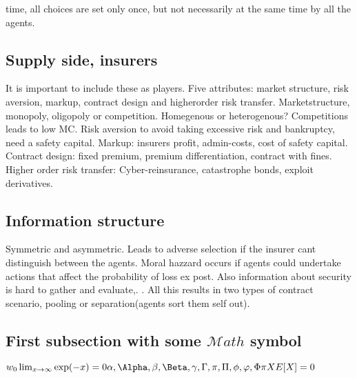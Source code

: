 time, all choices are set only once, but not necessarily at the same time by all the agents. 
\subsection{Supply side, insurers}
It is important to include these as players. Five attributes: market structure, risk aversion, markup, contract design and higherorder risk transfer.
Marketstructure, monopoly, oligopoly or competition. Homegenous or heterogenous? Competitions leads to low MC. Risk aversion to avoid taking excessive risk and bankruptcy, need a safety capital. 
Markup: insurers profit, admin-costs, cost of safety capital. 
Contract design: fixed premium, premium differentiation, contract with fines.
Higher order risk transfer: 
Cyber-reinsurance, catastrophe bonds, exploit derivatives.
\subsection{Information structure}
Symmetric and asymmetric. Leads to adverse selection if the insurer cant distinguish between the agents. Moral hazzard occurs if agents could undertake actions that affect the probability of loss ex post. Also information about security is hard to gather and evaluate,. . All this results in two types of contract scenario, pooling or separation(agents sort them self out).


 
\subsection{First subsection with some \texorpdfstring{$\mathcal{M}ath$}{Math} symbol}\label{sec:first_ssection}
\begin{math} w_{0} \lim_{x \to \infty} \exp(-x) = 0 \alpha, \Alpha, \beta, \Beta, \gamma, \Gamma,
  \pi, \Pi, \phi, \varphi, \Phi  \pi 
  X E[X]=0 \end{math}
\blindtext



